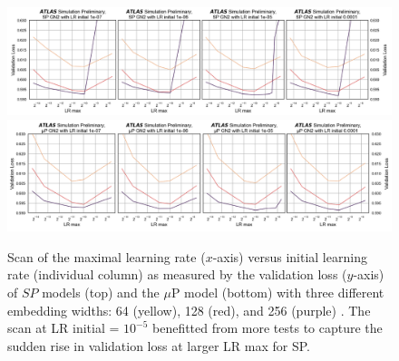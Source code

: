 \begin{figure}[h!]
  \centering
  \includegraphics[width=\textwidth]{Images/FTAG/GN/HPO/fullSP2.png}\\
  \includegraphics[width=\textwidth]{Images/FTAG/GN/HPO/fullmup2.png}
  \caption{Scan of the maximal learning rate ($x$-axis) versus initial learning rate (individual column) as measured by the validation loss ($y$-axis) of $SP$ models (top) and the $\mu$P model (bottom) with three different embedding widths: 64 (yellow), 128 (red), and 256 (purple) \cite{publicplotMUP}. The scan at LR initial = $10^{-5}$ benefitted from more tests to capture the sudden rise in validation loss at larger LR max for SP.}
  \label{fig:fullSPmup}
\end{figure} 

